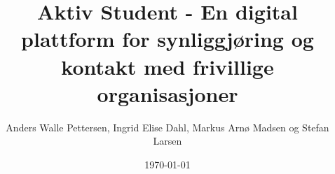 \def\category{Utvikling}
\def\ects{20}
\def\area{Informasjonsarkitektur}
\def\free{X}
\def\freeafter{(30/12 2029)}
\def\freecustomer{(X)}

\def\customer{HiØ v/Tommy Payne}
\def\tutor{Joakim Karlsen}
\def\department{Avdeling for Informasjonsteknologi: Digitale Medier og Design, Informatikk - Design og Utvikling av IT-systemer}
\def\projectnr{BO20-G06}
\def\contact{Tommy Payne}
\def\abstract{}
\def\keyone{}
\def\keytwo{}
\def\keythree{}
\author{Anders Walle Pettersen, Ingrid Elise Dahl, Markus Arnø Madsen og Stefan Larsen}
\title{Aktiv Student - En digital plattform for synliggjøring og kontakt med frivillige organisasjoner}
\date{\today
}

